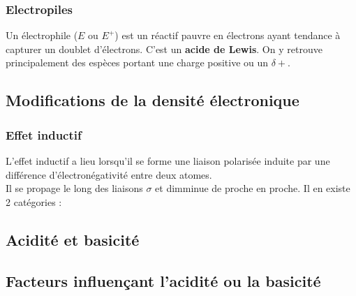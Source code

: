 \documentclass{article}
\newcommand{\insertslide}[2]{
\begin{center}
    \fbox{\texttt{[image: \#1]}}
\end{center}
}
\begin{document}
        \subsubsection{Electropiles}
            Un électrophile ($E$ ou $E^+$) est un réactif pauvre en électrons ayant tendance à capturer un doublet d'électrons. C'est un \textbf{acide de Lewis}.
            On y retrouve principalement des espèces portant une charge positive ou un $\delta +$.
    \subsection{Modifications de la densité électronique}
        \subsubsection{Effet inductif}
            L'effet inductif a lieu lorsqu'il se forme une liaison polarisée induite par une différence d'électronégativité entre deux atomes.\\
            Il se propage le long des liaisons $\sigma$ et dimminue de proche en proche.
            Il en existe 2 catégories :
            \insertslide{Slides/CM3}{20}
    \subsection{Acidité et basicité}
    \subsection{Facteurs influençant l'acidité ou la basicité}
\end{document}
